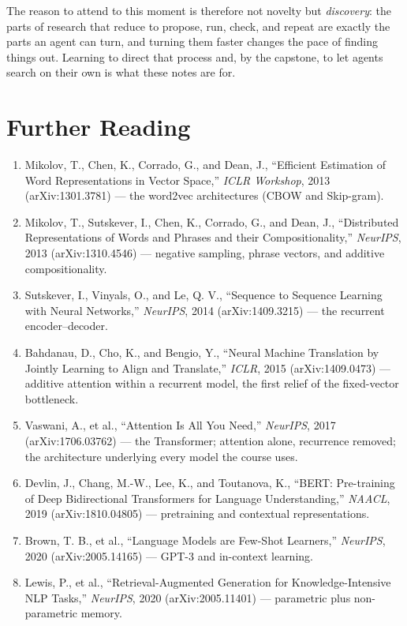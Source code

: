The reason to attend to this moment is therefore not novelty but \emph{discovery}: the parts of research that reduce to propose, run, check, and repeat are exactly the parts an agent can turn, and turning them faster changes the pace of finding things out.
Learning to direct that process and, by the capstone, to let agents search on their own is what these notes are for.


\section*{Further Reading}

\begin{small}
\begin{enumerate}
\item Mikolov, T., Chen, K., Corrado, G., and Dean, J., ``Efficient Estimation of Word Representations in Vector Space,'' \emph{ICLR Workshop}, 2013 (arXiv:1301.3781) — the word2vec architectures (CBOW and Skip-gram).
\item Mikolov, T., Sutskever, I., Chen, K., Corrado, G., and Dean, J., ``Distributed Representations of Words and Phrases and their Compositionality,'' \emph{NeurIPS}, 2013 (arXiv:1310.4546) — negative sampling, phrase vectors, and additive compositionality.
\item Sutskever, I., Vinyals, O., and Le, Q. V., ``Sequence to Sequence Learning with Neural Networks,'' \emph{NeurIPS}, 2014 (arXiv:1409.3215) — the recurrent encoder--decoder.
\item Bahdanau, D., Cho, K., and Bengio, Y., ``Neural Machine Translation by Jointly Learning to Align and Translate,'' \emph{ICLR}, 2015 (arXiv:1409.0473) — additive attention within a recurrent model, the first relief of the fixed-vector bottleneck.
\item Vaswani, A., et al., ``Attention Is All You Need,'' \emph{NeurIPS}, 2017 (arXiv:1706.03762) — the Transformer; attention alone, recurrence removed; the architecture underlying every model the course uses.
\item Devlin, J., Chang, M.-W., Lee, K., and Toutanova, K., ``BERT: Pre-training of Deep Bidirectional Transformers for Language Understanding,'' \emph{NAACL}, 2019 (arXiv:1810.04805) — pretraining and contextual representations.
\item Brown, T. B., et al., ``Language Models are Few-Shot Learners,'' \emph{NeurIPS}, 2020 (arXiv:2005.14165) — GPT-3 and in-context learning.
\item Lewis, P., et al., ``Retrieval-Augmented Generation for Knowledge-Intensive NLP Tasks,'' \emph{NeurIPS}, 2020 (arXiv:2005.11401) — parametric plus non-parametric memory.

\end{enumerate}
\end{small}
